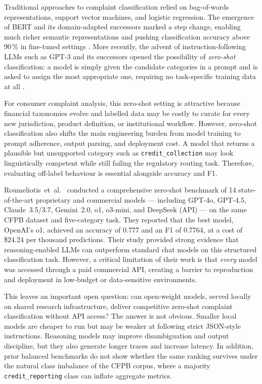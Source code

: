 \documentclass[journal]{IEEEtran}
\begin{document}
Traditional approaches to complaint classification relied on
bag-of-words representations, support vector machines, and logistic
regression. The emergence of BERT \cite{devlin2019bert} and its
domain-adapted successors marked a step change, enabling much richer
semantic representations and pushing classification accuracy above
90\,\% in fine-tuned settings \cite{vairetti2024bert}. More recently,
the advent of instruction-following LLMs such as GPT-3 \cite{brown2020gpt3}
and its successors opened the possibility of \emph{zero-shot}
classification: a model is simply given the candidate categories in
a prompt and is asked to assign the most appropriate one, requiring
no task-specific training data at all
\cite{kojima2022zeroshotcot,madanchian2024genai}.

For consumer complaint analysis, this zero-shot setting is attractive
because financial taxonomies evolve and labelled data may be costly to
curate for every new jurisdiction, product definition, or institutional
workflow. However, zero-shot classification also shifts the main
engineering burden from model training to prompt adherence, output
parsing, and deployment cost. A model that returns a plausible but
unsupported category such as \texttt{credit\_collection} may look
linguistically competent while still failing the regulatory routing
task. Therefore, evaluating off-label behaviour is essential alongside
accuracy and F1.

Roumeliotis~et~al.\ \cite{roumeliotis2025think} conducted a
comprehensive zero-shot benchmark of 14 state-of-the-art proprietary
and commercial models — including GPT-4o, GPT-4.5, Claude~3.5/3.7,
Gemini~2.0, o1, o3-mini, and DeepSeek (API) — on the same CFPB
dataset and five-category task. They reported that the best model,
OpenAI's o1, achieved an accuracy of 0.777 and an F1 of 0.7764, at a
cost of \$24.24 per thousand predictions. Their study provided strong
evidence that reasoning-enabled LLMs can outperform standard chat
models on this structured classification task. However, a critical
limitation of their work is that \emph{every} model was accessed
through a paid commercial API, creating a barrier to reproduction
and deployment in low-budget or data-sensitive environments.

This leaves an important open question: can open-weight models, served
locally on shared research infrastructure, deliver competitive
zero-shot complaint classification without API access? The answer is
not obvious. Smaller local models are cheaper to run but may be weaker
at following strict JSON-style instructions. Reasoning models may
improve disambiguation and output discipline, but they also generate
longer traces and increase latency. In addition, prior balanced
benchmarks do not show whether the same ranking survives under the
natural class imbalance of the CFPB corpus, where a majority
\texttt{credit\_reporting} class can inflate aggregate metrics.
\end{document}
